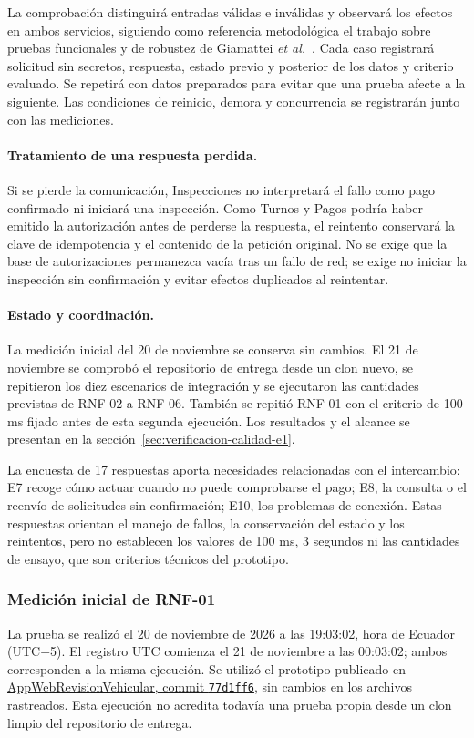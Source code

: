 \documentclass[11pt,a4paper]{article}
\begin{document}
	La comprobación distinguirá entradas válidas e inválidas y observará los efectos en ambos servicios, siguiendo como referencia metodológica el trabajo sobre pruebas funcionales y de robustez de Giamattei \emph{et al.}~\cite{giamattei2024robustness}. Cada caso registrará solicitud sin secretos, respuesta, estado previo y posterior de los datos y criterio evaluado. Se repetirá con datos preparados para evitar que una prueba afecte a la siguiente. Las condiciones de reinicio, demora y concurrencia se registrarán junto con las mediciones.
	
	\paragraph{Tratamiento de una respuesta perdida.}
	Si se pierde la comunicación, Inspecciones no interpretará el fallo como pago confirmado ni iniciará una inspección. Como Turnos y Pagos podría haber emitido la autorización antes de perderse la respuesta, el reintento conservará la clave de idempotencia y el contenido de la petición original. No se exige que la base de autorizaciones permanezca vacía tras un fallo de red; se exige no iniciar la inspección sin confirmación y evitar efectos duplicados al reintentar.
	
	\paragraph{Estado y coordinación.}
	La medición inicial del 20 de noviembre se conserva sin cambios. El 21 de noviembre se comprobó el repositorio de entrega desde un clon nuevo, se repitieron los diez escenarios de integración y se ejecutaron las cantidades previstas de RNF-02 a RNF-06. También se repitió RNF-01 con el criterio de 100 ms fijado antes de esta segunda ejecución. Los resultados y el alcance se presentan en la sección~\ref{sec:verificacion-calidad-e1}.
	
	La encuesta de 17 respuestas aporta necesidades relacionadas con el intercambio: E7 recoge cómo actuar cuando no puede comprobarse el pago; E8, la consulta o el reenvío de solicitudes sin confirmación; E10, los problemas de conexión. Estas respuestas orientan el manejo de fallos, la conservación del estado y los reintentos, pero no establecen los valores de 100 ms, 3 segundos ni las cantidades de ensayo, que son criterios técnicos del prototipo.
	
	
	\subsubsection{Medición inicial de RNF-01}
	La prueba se realizó el 20 de noviembre de 2026 a las 19:03:02, hora de Ecuador (UTC$-$5). El registro UTC comienza el 21 de noviembre a las 00:03:02; ambos corresponden a la misma ejecución. Se utilizó el prototipo publicado en \href{https://github.com/NixonPiguave/AppWebRevisionVehicular/tree/77d1ff6c38488fc02ab431472621ff4edb59f576/prototipo-e1}{AppWebRevisionVehicular, commit \texttt{77d1ff6}}, sin cambios en los archivos rastreados. Esta ejecución no acredita todavía una prueba propia desde un clon limpio del repositorio de entrega.
	
\end{document}
